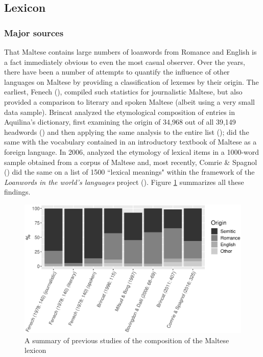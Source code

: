 \documentclass[output=paper]{langsci/langscibook}
\begin{document}


\subsection{Lexicon} \label{mtlexicon} %
\subsubsection{Major sources}
That Maltese contains large numbers of loanwords from Romance and English is a fact immediately obvious to even the most casual observer. Over the years, there have been a number of attempts to quantify the influence of other languages on Maltese by providing a classification of lexemes by their origin. The earliest, Fenech (\citeyear[216--217]{fenech1978}), compiled such statistics for journalistic Maltese, but also provided a comparison to literary and spoken Maltese (albeit using a very small data sample). Brincat analyzed the etymological composition of entries in Aquilina's dictionary, first examining the origin of 34,968 out of all 39,149 headwords (\citealt[115]{brincat1996}) and then applying the same analysis to the entire list (\citealt[407]{brincat2011});  \cite{mifsudborg1997} did the same with the vocabulary contained in an introductory textbook of Maltese as a foreign language. In 2006, \cite{bovingdondalli2006} analyzed the etymology of lexical items in a 1000-word sample obtained from a corpus of Maltese and, most recently, Comrie \& Spagnol (\citeyear[318]{comriespagnol2016}) did the same on a list of 1500 ``lexical meanings" within the framework of the \textit{Loanwords in the world’s languages} project (\citealt{HaspelmathTadmor2009}). Figure \ref{lexicon} summarizes all these findings.
\begin{figure}[H]
\centering
\includegraphics[width=12cm]{figures/lexicon.eps}
\caption{A summary of previous studies of the composition of the Maltese lexicon}
\label{lexicon}
\end{figure}
\end{document}
